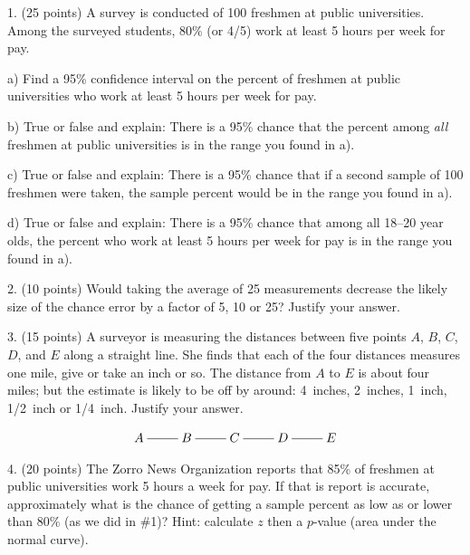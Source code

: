 \documentclass[10pt]{article}
\begin{document}
1. (25 points) A survey is conducted of 100 freshmen at public universities.
Among the surveyed  students, 80\% (or 4/5) work at least 5 hours per week for pay.

\hspace{20pt} a) Find a 95\% confidence interval
on the  percent of freshmen at public universities who work at least 5 hours per week for pay.
\vspace{2.3in}

\hspace{20pt} b) True or false and explain:  There is a 95\% chance that the
percent among \textit{all} freshmen at public universities is in the range you found in a).
\vspace{1.5in}

\hspace{20pt} c) True or false and explain:  There is a 95\% chance that
if a second sample of 100 freshmen were taken,
the sample percent would be in the range you found in a).
\vspace{1.5in}

\hspace{20pt} d) True or false and explain:  There is a 95\% chance that 
 among all 18--20 year olds, the percent who work at least 5 hours per week for pay 
is in the range you found in a).
\vspace{1in}
\vfill
\eject
{\ }



2. (10 points)
Would taking the average of 25 measurements decrease
the likely size of the chance error by a factor of 5, 10 or 25? Justify your answer.
\vspace{1.5in}

3. (15 points) A surveyor is measuring the distances between five points $A$, $B$, $C$,
$D$, and $E$ along a straight line.  She finds that each of the four distances measures one mile, give or take an inch or so.  The distance from $A$ to $E$ is about four miles; 
but the estimate is likely to be off by around:  
4~inches, 2~inches, 1~inch, 1/2~inch or 1/4~inch. Justify your answer.\vspace{-5pt}

\[\xymatrix{
A\ar@{-}[r] & B\ar@{-}[r] & C\ar@{-}[r] & D\ar@{-}[r] & E}\]
\vspace{2in}


4.  (20 points) The Zorro News Organization reports that  85\%
of freshmen at public universities  work 5 hours a week for pay.
If that is report is accurate, approximately what is the chance of getting a sample
percent as low as or lower than 80\% (as we did in \#1)?  Hint:  calculate $z$ then a $p$-value (area under the normal curve).
\vfill
\eject
\end{document}
